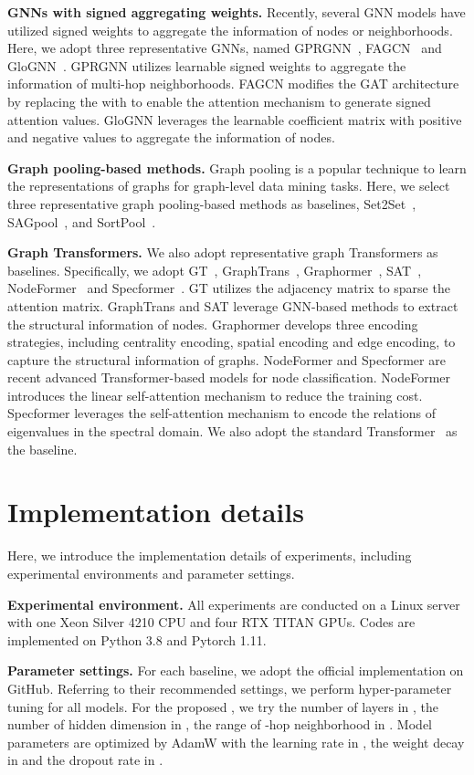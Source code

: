 \documentclass[sigconf, screen]{acmart}
\begin{document}
\textbf{GNNs with signed aggregating weights.}
Recently, several GNN models have utilized signed weights to aggregate the information of nodes or neighborhoods.
Here, we adopt three representative GNNs, named GPRGNN~\cite{gprgnn}, FAGCN~\cite{fagcn} and GloGNN~\cite{glognn}.
GPRGNN utilizes learnable signed weights to aggregate the information of multi-hop neighborhoods.
FAGCN modifies the GAT architecture by replacing the  with  to enable the attention mechanism to generate signed attention values.
GloGNN leverages the learnable coefficient matrix with positive and negative values to aggregate the information of nodes.

\textbf{Graph pooling-based methods.}
Graph pooling is a popular technique to learn the representations of graphs for graph-level data mining tasks.
Here, we select three representative graph pooling-based methods as baselines, Set2Set~\cite{set2set}, SAGpool~\cite{sagpool}, and SortPool~\cite{sortpool}.

\textbf{Graph Transformers.}
We also adopt representative graph Transformers as baselines.
Specifically, we adopt GT~\cite{gt}, GraphTrans~\cite{graphtrans}, Graphormer~\cite{graphormer}, SAT~\cite{sat}, NodeFormer~\cite{nodeformer} and Specformer~\cite{specformer}.
GT utilizes the adjacency matrix to sparse the attention matrix.
GraphTrans and SAT leverage GNN-based methods to extract the structural information of nodes.
Graphormer develops three encoding strategies, including centrality encoding, spatial encoding and edge encoding, to capture the structural information of graphs.
NodeFormer and Specformer are recent advanced Transformer-based models for node classification.
NodeFormer introduces the linear self-attention mechanism to reduce the training cost.
Specformer leverages the self-attention mechanism to encode the relations of eigenvalues in the spectral domain. 
We also adopt the standard Transformer~\cite{transformer} as the baseline. 


\section{Implementation details}\label{app_para}
Here, we introduce the implementation details of experiments, including experimental environments and parameter settings.

\textbf{Experimental environment.}
All experiments are conducted on a Linux server with one Xeon Silver 4210 CPU and four RTX TITAN GPUs. 
Codes are implemented on Python 3.8 and Pytorch 1.11.

\textbf{Parameter settings.}
For each baseline, we adopt the official implementation on GitHub.
Referring to their recommended settings, we perform hyper-parameter tuning for all models.
For the proposed \name, we try the number of layers in , the number of hidden dimension in , the range of -hop neighborhood in .
Model parameters are optimized by AdamW \cite{adamw} with the learning rate in , the weight decay in  and the dropout rate in .
 
\end{document}
